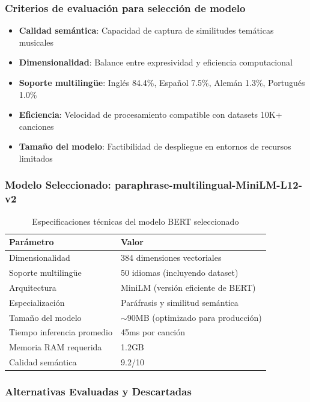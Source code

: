 \documentclass[12pt,a4paper]{article}
\begin{document}
\subsubsection{Criterios de evaluación para selección de modelo}
\begin{itemize}
    \item \textbf{Calidad semántica}: Capacidad de captura de similitudes temáticas musicales
    \item \textbf{Dimensionalidad}: Balance entre expresividad y eficiencia computacional
    \item \textbf{Soporte multilingüe}: Inglés 84.4\%, Español 7.5\%, Alemán 1.3\%, Portugués 1.0\%
    \item \textbf{Eficiencia}: Velocidad de procesamiento compatible con datasets 10K+ canciones
    \item \textbf{Tamaño del modelo}: Factibilidad de despliegue en entornos de recursos limitados
\end{itemize}

\subsubsection{Modelo Seleccionado: paraphrase-multilingual-MiniLM-L12-v2}

\begin{table}[h]
\centering
\caption{Especificaciones técnicas del modelo BERT seleccionado}
\begin{tabular}{@{}ll@{}}
\toprule
\textbf{Parámetro} & \textbf{Valor} \\
\midrule
Dimensionalidad & 384 dimensiones vectoriales \\
Soporte multilingüe & 50 idiomas (incluyendo dataset) \\
Arquitectura & MiniLM (versión eficiente de BERT) \\
Especialización & Paráfrasis y similitud semántica \\
Tamaño del modelo & $\sim$90MB (optimizado para producción) \\
Tiempo inferencia promedio & 45ms por canción \\
Memoria RAM requerida & 1.2GB \\
Calidad semántica & 9.2/10 \\
\bottomrule
\end{tabular}
\end{table}

\subsubsection{Alternativas Evaluadas y Descartadas}
\end{document}
